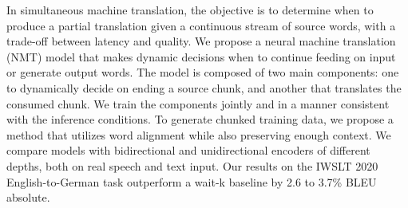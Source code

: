 In simultaneous machine translation, the objective is to determine when to produce a partial translation given a continuous stream of source words, with a trade-off between latency  and quality. We propose a neural machine translation (NMT) model that makes dynamic decisions when to continue feeding on input or generate output words. The model is composed of two main components: one to dynamically decide on ending a source chunk, and another that translates the consumed chunk. We train the components jointly and in a manner consistent with the inference conditions. To generate chunked training data, we propose a method that utilizes word alignment while also preserving enough context. We compare models with bidirectional and unidirectional encoders of different depths, both on real speech and text input.  Our results on the IWSLT 2020 English-to-German task outperform a wait-k baseline by 2.6 to 3.7\% BLEU absolute.
